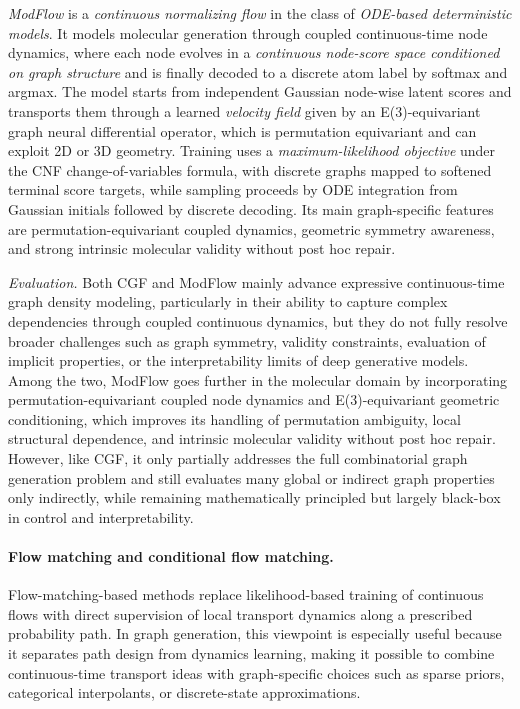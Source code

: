 \documentclass{article}
\begin{document}
\emph{ModFlow} \cite{verma2022modular} is a \emph{continuous normalizing flow} in the class of \emph{ODE-based deterministic models}. It models molecular generation through coupled continuous-time node dynamics, where each node evolves in a \emph{continuous node-score space conditioned on graph structure} and is finally decoded to a discrete atom label by softmax and argmax. The model starts from independent Gaussian node-wise latent scores and transports them through a learned \emph{velocity field} given by an E(3)-equivariant graph neural differential operator, which is permutation equivariant and can exploit 2D or 3D geometry. Training uses a \emph{maximum-likelihood objective} under the CNF change-of-variables formula, with discrete graphs mapped to softened terminal score targets, while sampling proceeds by ODE integration from Gaussian initials followed by discrete decoding. Its main graph-specific features are permutation-equivariant coupled dynamics, geometric symmetry awareness, and strong intrinsic molecular validity without post hoc repair.


\emph{Evaluation. } Both CGF and ModFlow mainly advance expressive continuous-time graph density modeling, particularly in their ability to capture complex dependencies through coupled continuous dynamics, but they do not fully resolve broader challenges such as graph symmetry, validity constraints, evaluation of implicit properties, or the interpretability limits of deep generative models. Among the two, ModFlow goes further in the molecular domain by incorporating permutation-equivariant coupled node dynamics and E(3)-equivariant geometric conditioning, which improves its handling of permutation ambiguity, local structural dependence, and intrinsic molecular validity without post hoc repair. However, like CGF, it only partially addresses the full combinatorial graph generation problem and still evaluates many global or indirect graph properties only indirectly, while remaining mathematically principled but largely black-box in control and interpretability.


\paragraph{Flow matching and conditional flow matching.}
Flow-matching-based methods replace likelihood-based training of continuous flows with direct supervision of local transport dynamics along a prescribed probability path. In graph generation, this viewpoint is especially useful because it separates path design from dynamics learning, making it possible to combine continuous-time transport ideas with graph-specific choices such as sparse priors, categorical interpolants, or discrete-state approximations.
\end{document}
